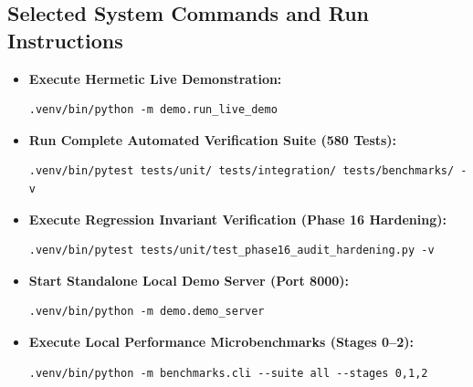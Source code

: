 \documentclass[a4paper]{article}
\begin{document}
\subsection{Selected System Commands and Run Instructions}
\begin{itemize}
    \item \textbf{Execute Hermetic Live Demonstration:}
\begin{Verbatim}[fontsize=\footnotesize,breaklines=true]
.venv/bin/python -m demo.run_live_demo
\end{Verbatim}
    \item \textbf{Run Complete Automated Verification Suite (580 Tests):}
\begin{Verbatim}[fontsize=\footnotesize,breaklines=true]
.venv/bin/pytest tests/unit/ tests/integration/ tests/benchmarks/ -v
\end{Verbatim}
    \item \textbf{Execute Regression Invariant Verification (Phase 16 Hardening):}
\begin{Verbatim}[fontsize=\footnotesize,breaklines=true]
.venv/bin/pytest tests/unit/test_phase16_audit_hardening.py -v
\end{Verbatim}
    \item \textbf{Start Standalone Local Demo Server (Port 8000):}
\begin{Verbatim}[fontsize=\footnotesize,breaklines=true]
.venv/bin/python -m demo.demo_server
\end{Verbatim}
    \item \textbf{Execute Local Performance Microbenchmarks (Stages 0--2):}
\begin{Verbatim}[fontsize=\footnotesize,breaklines=true]
.venv/bin/python -m benchmarks.cli --suite all --stages 0,1,2
\end{Verbatim}
\end{itemize}
\end{document}
